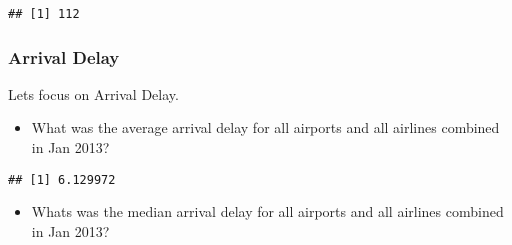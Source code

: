 \documentclass[
]{article}
\newenvironment{Shaded}{\begin{snugshade}}{\end{snugshade}}
\newcommand{\DataTypeTok}[1]{\textcolor[rgb]{0.13,0.29,0.53}{#1}}
\newcommand{\DecValTok}[1]{\textcolor[rgb]{0.00,0.00,0.81}{#1}}
\newcommand{\KeywordTok}[1]{\textcolor[rgb]{0.13,0.29,0.53}{\textbf{#1}}}
\newcommand{\NormalTok}[1]{#1}
\newcommand{\OperatorTok}[1]{\textcolor[rgb]{0.81,0.36,0.00}{\textbf{#1}}}
\newcommand{\StringTok}[1]{\textcolor[rgb]{0.31,0.60,0.02}{#1}}
\providecommand{\tightlist}{%
  \setlength{\itemsep}{0pt}\setlength{\parskip}{0pt}}
\begin{document}
\begin{Shaded}
\end{Shaded}

\begin{verbatim}
## [1] 112
\end{verbatim}

\hypertarget{arrival-delay}{%
\subsubsection{Arrival Delay}\label{arrival-delay}}

Lets focus on Arrival Delay.

\begin{itemize}
\tightlist
\item
  What was the average arrival delay for all airports and all airlines
  combined in Jan 2013?
\end{itemize}

\begin{Shaded}
\end{Shaded}

\begin{verbatim}
## [1] 6.129972
\end{verbatim}

\begin{itemize}
\tightlist
\item
  Whats was the median arrival delay for all airports and all airlines
  combined in Jan 2013?
\end{itemize}
\end{document}
